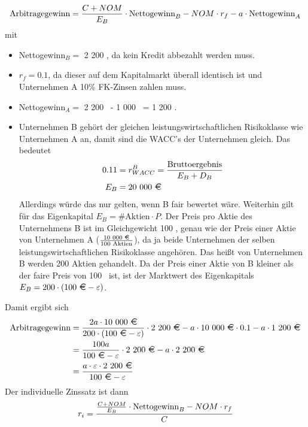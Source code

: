 \documentclass{article}
\renewcommand{\epsilon}{\varepsilon}
\begin{document}
\begin{enumerate}[label=(\alph*)]
		\begin{align}
			\text{Arbitragegewinn} = \frac{C+NOM}{E_B}\cdot\text{Nettogewinn}_B - NOM\cdot r_f - a\cdot\text{Nettogewinn}_A \notag
		\end{align}
		mit
		\begin{itemize}
			\item Nettogewinn$_B=$ 2 200 \EUR, da kein Kredit abbezahlt werden muss.
			\item $r_f=0.1$, da dieser auf dem Kapitalmarkt überall identisch ist und Unternehmen A 10\% FK-Zinsen zahlen muss.
			\item Nettogewinn$_A=$ 2 200 \EUR\ - 1 000 \EUR\, = 1 200 \EUR.
			\item Unternehmen B gehört der gleichen leistungswirtschaftlichen Risikoklasse wie Unternehmen A an, damit sind die WACC's der Unternehmen gleich. Das bedeutet
			\begin{align}
				0.11 &= r_{WACC}^B = \frac{\text{Bruttoergebnis}}{E_B+D_B} \notag \\
				E_B &= \text{20 000 \EUR} \notag
			\end{align}
			Allerdings würde das nur gelten, wenn B fair bewertet wäre. Weiterhin gilt für das Eigenkapital $E_B=\text{\# Aktien}\cdot P$. Der Preis pro Aktie des Unternehmens B ist im Gleichgewicht 100 \EUR, genau wie der Preis einer Aktie von Unternehmen A ($\frac{\text{10 000 \EUR}}{100\text{ Aktien}}$), da ja beide Unternehmen der selben leistungswirtschaftlichen Risikoklasse angehören. Das heißt von Unternehmen B werden 200 Aktien gehandelt. Da der Preis einer Aktie von B kleiner als der faire Preis von 100 \EUR\, ist, ist der Marktwert des Eigenkapitals $E_B=200\cdot (100\text{ \EUR}-\epsilon)$.
		\end{itemize}
		Damit ergibt sich
		\begin{align}
			\text{Arbitragegewinn} &= \frac{2a\cdot\text{10 000 \EUR}}{200\cdot (100\text{ \EUR}-\epsilon)}\cdot\text{2 200 \EUR} - a\cdot\text{10 000 \EUR}\cdot 0.1 - a\cdot\text{1 200 \EUR} \notag \\
			&= \frac{100a}{100\text{ \EUR}-\epsilon}\cdot \text{2 200 \EUR} - a\cdot \text{2 200 \EUR} \notag \\
			&= \frac{a\cdot\epsilon\cdot\text{2 200 \EUR}}{100\text{ \EUR} - \epsilon} \notag
		\end{align}
		Der individuelle Zinssatz ist dann
		\begin{align}
			r_i &= \frac{\frac{C+NOM}{E_B}\cdot\text{Nettogewinn}_B - NOM\cdot r_f}{C} \notag \\

\end{align}
\end{enumerate}
\end{document}
